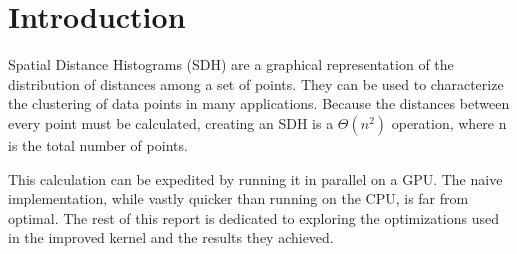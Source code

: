 	\section{Introduction}
	\hspace{\parindent}Spatial Distance Histograms (SDH) are a graphical representation of the distribution of distances among a set of points. They can be used to characterize the clustering of data points in many applications. Because the distances between every point must be calculated, creating an SDH is a $\Theta(n^2)$ operation, where n is the total number of points.
	
	This calculation can be expedited by running it in parallel on a GPU. The naive implementation, while vastly quicker than running on the CPU, is far from optimal. The rest of this report is dedicated to exploring the optimizations used in the improved kernel and the results they achieved.%